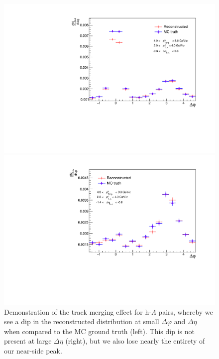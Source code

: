 \begin{figure}[ht]
	\centering
	\begin{minipage}{0.48\textwidth}
		\includegraphics[width=\textwidth]{figures/analysis/trackmerge_lambda_dphi_small_deta.pdf}
	\end{minipage}
	\begin{minipage}{0.48\textwidth}
		\includegraphics[width=\textwidth]{figures/analysis/trackmerge_lambda_dphi_large_deta.pdf}
	\end{minipage}
	\caption{Demonstration of the track merging effect for h-$\Lambda$ pairs, whereby we see a dip in the reconstructed distribution at small $\Delta\varphi$ and $\Delta\eta$ when compared to the MC ground truth (left). This dip is not present at large $\Delta\eta$ (right), but we also lose nearly the entirety of our near-side peak.}
	\label{fig:trackmerge_diagram_lambda}
\end{figure}

